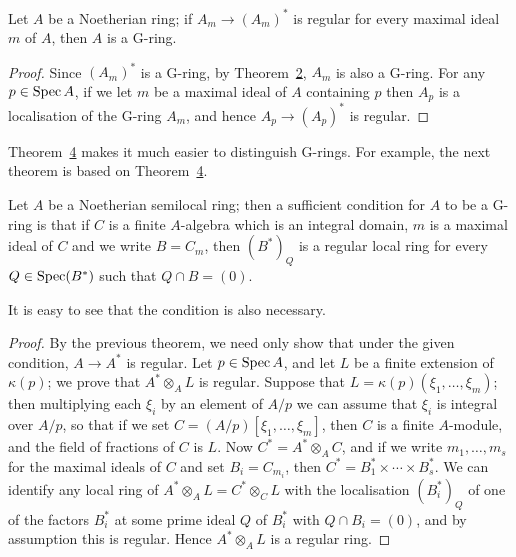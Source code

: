 \begin{theorem}\label{thm:32.4}
Let $A$ be a Noetherian ring; if $A_m \to (A_m)^*$ is regular for every maximal ideal
$m$ of $A$, then $A$ is a G-ring.
\end{theorem}

\begin{proof}
Since $(A_m)^*$ is a G-ring, by Theorem~\hyperref[thm:32.2]{2}, $A_m$ is also a G-ring. For any
$p \in \operatorname{Spec} A$, if we let $m$ be a maximal ideal of $A$ containing $p$ then $A_p$ is a
localisation of the G-ring $A_m$, and hence $A_p \to (A_p)^*$ is regular.
\end{proof}

Theorem~\hyperref[thm:32.4]{4} makes it much easier to distinguish G-rings. For example, the
next theorem is based on Theorem~\hyperref[thm:32.4]{4}.

\begin{theorem}\label{thm:32.5}
Let $A$ be a Noetherian semilocal ring; then a sufficient condition for $A$ to be
a G-ring is that if $C$ is a finite $A$-algebra which is an integral domain, $m$ is
a maximal ideal of $C$ and we write $B = C_m$, then $(B^*)_Q$ is a regular local
ring for every $Q \in \operatorname{Spec}(B^*)$ such that $Q \cap B = (0)$.
\end{theorem}

\begin{remark}
It is easy to see that the condition is also necessary.
\end{remark}

\begin{proof}
By the previous theorem, we need only show that under the given condition,
$A \to A^*$ is regular. Let $p \in \operatorname{Spec} A$, and let $L$ be a finite extension of
$\kappa(p)$; we prove that $A^* \otimes_A L$ is regular. Suppose that
$L = \kappa(p)(\xi_1, \ldots, \xi_m)$; then multiplying each $\xi_i$ by an element of $A/p$ we
can assume that $\xi_i$ is integral over $A/p$, so that if we set
$C = (A/p)[\xi_1, \ldots, \xi_m]$, then $C$ is a finite $A$-module, and the field of
fractions of $C$ is $L$. Now $C^* = A^* \otimes_A C$, and if we write
$m_1, \ldots, m_s$ for the maximal ideals of $C$ and set $B_i = C_{m_i}$, then
$C^* = B_1^* \times \cdots \times B_s^*$. We can identify any local ring of
$A^* \otimes_A L = C^* \otimes_C L$ with the localisation $(B_i^*)_Q$ of one of the factors
$B_i^*$ at some prime ideal $Q$ of $B_i^*$ with $Q \cap B_i = (0)$, and by assumption
this is regular. Hence $A^* \otimes_A L$ is a regular ring.
\end{proof}

